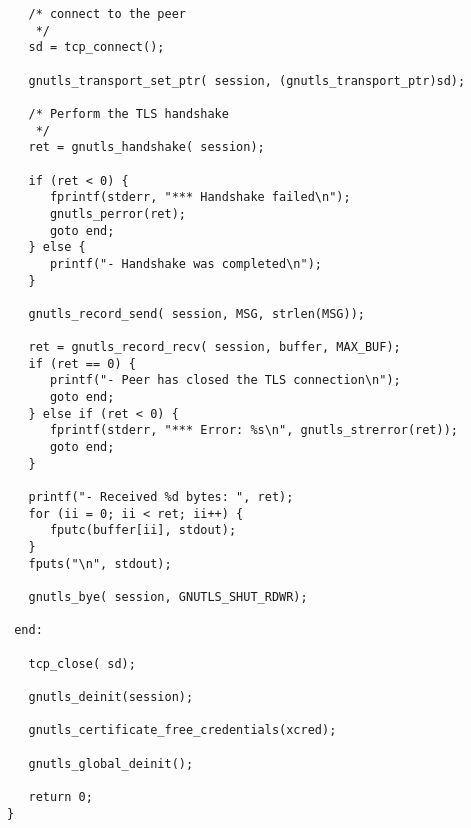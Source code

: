\begin{verbatim}
   /* connect to the peer
    */
   sd = tcp_connect();

   gnutls_transport_set_ptr( session, (gnutls_transport_ptr)sd);

   /* Perform the TLS handshake
    */
   ret = gnutls_handshake( session);

   if (ret < 0) {
      fprintf(stderr, "*** Handshake failed\n");
      gnutls_perror(ret);
      goto end;
   } else {
      printf("- Handshake was completed\n");
   }

   gnutls_record_send( session, MSG, strlen(MSG));

   ret = gnutls_record_recv( session, buffer, MAX_BUF);
   if (ret == 0) {
      printf("- Peer has closed the TLS connection\n");
      goto end;
   } else if (ret < 0) {
      fprintf(stderr, "*** Error: %s\n", gnutls_strerror(ret));
      goto end;
   }

   printf("- Received %d bytes: ", ret);
   for (ii = 0; ii < ret; ii++) {
      fputc(buffer[ii], stdout);
   }
   fputs("\n", stdout);

   gnutls_bye( session, GNUTLS_SHUT_RDWR);

 end:

   tcp_close( sd);

   gnutls_deinit(session);

   gnutls_certificate_free_credentials(xcred);

   gnutls_global_deinit();

   return 0;
}

\end{verbatim}
